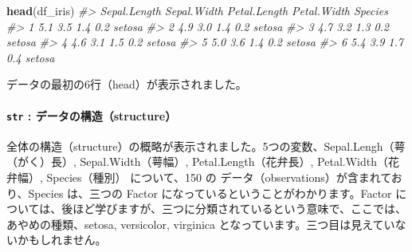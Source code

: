 \documentclass[
  xelatex, ja=standard]{bxjsbook}
\newenvironment{Shaded}{\begin{snugshade}}{\end{snugshade}}
\newcommand{\CommentTok}[1]{\textcolor[rgb]{0.56,0.35,0.01}{\textit{#1}}}
\newcommand{\FunctionTok}[1]{\textcolor[rgb]{0.13,0.29,0.53}{\textbf{#1}}}
\newcommand{\NormalTok}[1]{#1}
\theoremstyle{definition}
\theoremstyle{definition}
\theoremstyle{definition}
\theoremstyle{definition}
\theoremstyle{remark}
\begin{document}
\begin{Shaded}
\begin{Highlighting}[]
\FunctionTok{head}\NormalTok{(df\_iris)}
\CommentTok{\#\textgreater{}   Sepal.Length Sepal.Width Petal.Length Petal.Width Species}
\CommentTok{\#\textgreater{} 1          5.1         3.5          1.4         0.2  setosa}
\CommentTok{\#\textgreater{} 2          4.9         3.0          1.4         0.2  setosa}
\CommentTok{\#\textgreater{} 3          4.7         3.2          1.3         0.2  setosa}
\CommentTok{\#\textgreater{} 4          4.6         3.1          1.5         0.2  setosa}
\CommentTok{\#\textgreater{} 5          5.0         3.6          1.4         0.2  setosa}
\CommentTok{\#\textgreater{} 6          5.4         3.9          1.7         0.4  setosa}
\end{Highlighting}
\end{Shaded}

データの最初の6行（head）が表示されました。

\hypertarget{str-ux30c7ux30fcux30bfux306eux69cbux9020structure}{%
\paragraph{\texorpdfstring{\texttt{str} : データの構造（structure）}{str : データの構造（structure）}}\label{str-ux30c7ux30fcux30bfux306eux69cbux9020structure}}

\begin{Shaded}
\end{Shaded}

全体の構造（structure）の概略が表示されました。5つの変数、Sepal.Lengh（萼（がく）長）, Sepal.Width（萼幅）, Petal.Length（花弁長）, Petal.Width（花弁幅）, Species（種別） について、150 の データ（observations）が含まれており、Species は、三つの Factor になっているということがわかります。Factor については、後ほど学びますが、三つに分類されているという意味で、ここでは、あやめの種類、setosa, versicolor, virginica となっています。三つ目は見えていないかもしれません。
\end{document}
